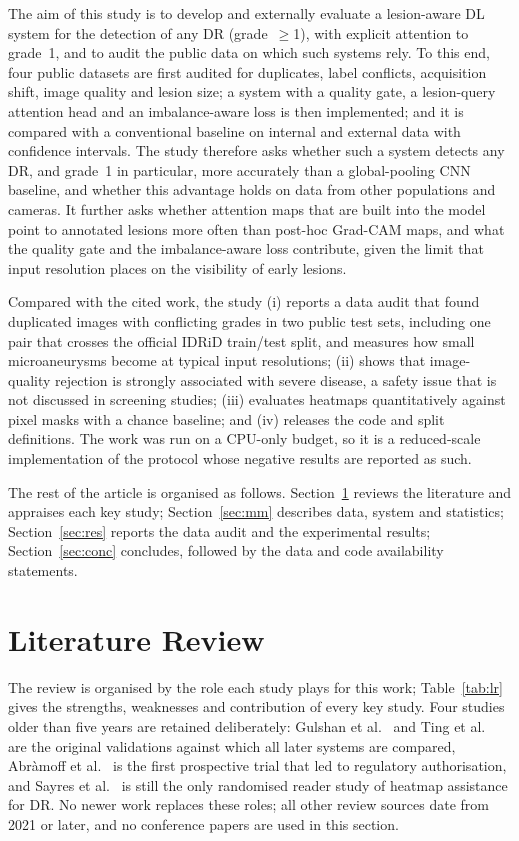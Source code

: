The aim of this study is to develop and externally evaluate a lesion-aware DL system for the detection of any DR (grade~$\geq$1), with explicit attention to grade~1, and to audit the public data on which such systems rely. To this end, four public datasets are first audited for duplicates, label conflicts, acquisition shift, image quality and lesion size; a system with a quality gate, a lesion-query attention head and an imbalance-aware loss is then implemented; and it is compared with a conventional baseline on internal and external data with confidence intervals. The study therefore asks whether such a system detects any DR, and grade~1 in particular, more accurately than a global-pooling CNN baseline, and whether this advantage holds on data from other populations and cameras. It further asks whether attention maps that are built into the model point to annotated lesions more often than post-hoc Grad-CAM maps, and what the quality gate and the imbalance-aware loss contribute, given the limit that input resolution places on the visibility of early lesions.

Compared with the cited work, the study (i) reports a data audit that found duplicated images with conflicting grades in two public test sets, including one pair that crosses the official IDRiD train/test split, and measures how small microaneurysms become at typical input resolutions; (ii) shows that image-quality rejection is strongly associated with severe disease, a safety issue that is not discussed in screening studies; (iii) evaluates heatmaps quantitatively against pixel masks with a chance baseline; and (iv) releases the code and split definitions. The work was run on a CPU-only budget, so it is a reduced-scale implementation of the protocol whose negative results are reported as such.

The rest of the article is organised as follows. Section~\ref{sec:lr} reviews the literature and appraises each key study; Section~\ref{sec:mm} describes data, system and statistics; Section~\ref{sec:res} reports the data audit and the experimental results; Section~\ref{sec:conc} concludes, followed by the data and code availability statements.

\section{Literature Review}\label{sec:lr}
The review is organised by the role each study plays for this work; Table~\ref{tab:lr} gives the strengths, weaknesses and contribution of every key study. Four studies older than five years are retained deliberately: Gulshan et al.\ \cite{gulshan2016} and Ting et al.\ \cite{ting2017} are the original validations against which all later systems are compared, Abr\`amoff et al.\ \cite{abramoff2018} is the first prospective trial that led to regulatory authorisation, and Sayres et al.\ \cite{sayres2019} is still the only randomised reader study of heatmap assistance for DR. No newer work replaces these roles; all other review sources date from 2021 or later, and no conference papers are used in this section.

